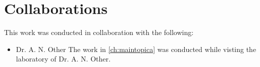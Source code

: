 

\chapter*{Collaborations} %

\thispagestyle{empty}

This work was conducted in collaboration with the following:

\begin{itemize}
    \item{Dr. A. N. Other} The work in \autoref{ch:maintopica} was conducted while visting the laboratory of Dr. A. N. Other.
\end{itemize}

\medskip


\newpage